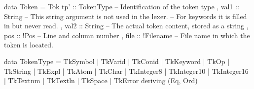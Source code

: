 \begin{haskell}
data Token = Tok
 { tp'  :: TokenType -- Identification of the token type
 , val1 :: String    -- This string argument is not used in the lexer.
                     -- For keywords it is filled in but never read.
 , val2 :: String    -- The actual token content, stored as a string
 , pos  :: !Pos      -- Line and column number
 , file :: !Filename -- File name in which the token is located.
 }

data TokenType
  = TkSymbol
  | TkVarid
  | TkConid
  | TkKeyword
  | TkOp
  | TkString
  | TkExpl
  | TkAtom
  | TkChar
  | TkInteger8
  | TkInteger10
  | TkInteger16
  | TkTextnm
  | TkTextln
  | TkSpace
  | TkError
  deriving (Eq, Ord)
\end{haskell}

